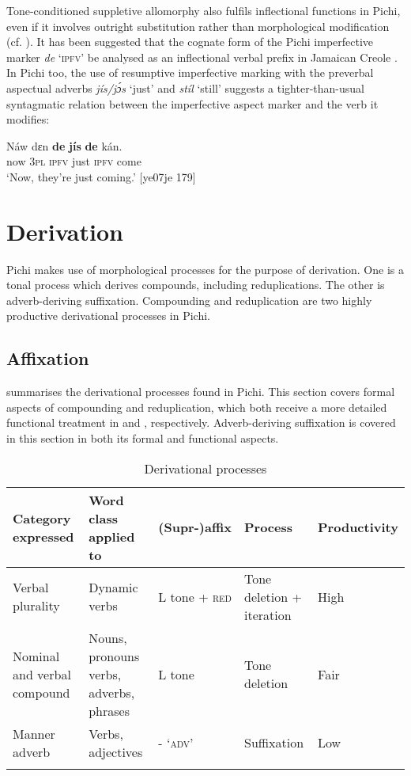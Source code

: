 Tone-conditioned suppletive allomorphy also fulfils inflectional functions in Pichi, even if it involves outright substitution rather than morphological modification (cf. ). It has been suggested that the cognate form of the Pichi imperfective marker \textit{de} ‘\textsc{ipfv}’ be analysed as an inflectional verbal prefix in Jamaican Creole \citep[30]{Farquharson2007}. In Pichi too, the use of resumptive imperfective marking with the preverbal aspectual adverbs \textit{jís/jɔ́s} ‘just’ and \textit{stíl} ‘still’ suggests a tighter-than-usual syntagmatic relation between the imperfective aspect marker and the verb it modifies:


\ea%
    \label{ex:key:98}
    \gll   Náw    dɛn  \textbf{de}  \textbf{jís}  \textbf{de}  kán.\\
now    \textsc{3pl}  \textsc{ipfv}  just  \textsc{ipfv}  come\\

\glt ‘Now, they’re just coming.’ [ye07je 179] 
\z

\section{Derivation}\label{sec:4.3}

Pichi makes use of morphological processes for the purpose of derivation. One is a tonal process which derives compounds, including reduplications. The other is adverb-deriving suffixation. Compounding and reduplication are two highly productive derivational processes in Pichi. 

\subsection{Affixation}
 summarises the derivational processes found in Pichi. This section covers formal aspects of compounding and reduplication, which both receive a more detailed functional treatment in  and , respectively. Adverb-deriving suffixation is covered in this section in both its formal and functional aspects.

\begin{table}
\caption	{Derivational processes}
\label{tab:key:4.2}
{\small\begin{tabularx}{\textwidth}{QQ lQ l}
\lsptoprule
Category expressed & Word class applied to & (Supr-)affix & Process & Productivity\\
\midrule
Verbal plurality & Dynamic verbs & L tone + \textsc{red} & Tone deletion + iteration & High\\

\tablevspace
Nominal and verbal compound & Nouns, pronouns verbs, adverbs, phrases & L tone & Tone deletion & Fair\\

\tablevspace
Manner adverb & Verbs, adjectives & {}- \textsc{‘adv’} & Suffixation & Low\\
\lspbottomrule
\end{tabularx}}
\end{table}

